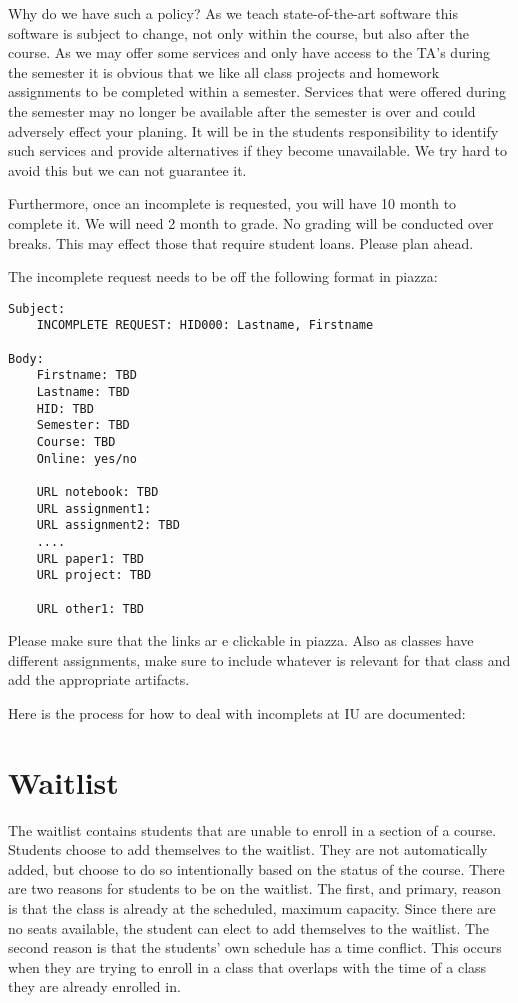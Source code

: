 Why do we have such a policy? As we teach state-of-the-art software this
software is subject to change, not only within the course, but also
after the course. As we may offer some services and only have access to
the TA's during the semester it is obvious that we like all class
projects and homework assignments to be completed within a semester.
Services that were offered during the semester may no longer be
available after the semester is over and could adversely effect your
planing. It will be in the students responsibility to identify such
services and provide alternatives if they become unavailable. We try
hard to avoid this but we can not guarantee it.

Furthermore, once an incomplete is requested, you will have 10 month to
complete it. We will need 2 month to grade. No grading will be conducted
over breaks. This may effect those that require student loans. Please
plan ahead.

The incomplete request needs to be off the following format in piazza:

\begin{verbatim}
Subject: 
    INCOMPLETE REQUEST: HID000: Lastname, Firstname

Body:
    Firstname: TBD
    Lastname: TBD
    HID: TBD
    Semester: TBD
    Course: TBD
    Online: yes/no

    URL notebook: TBD    
    URL assignment1:
    URL assignment2: TBD
    ....
    URL paper1: TBD
    URL project: TBD

    URL other1: TBD
\end{verbatim}

Please make sure that the links ar e clickable in piazza. Also as
classes have different assignments, make sure to include whatever is
relevant for that class and add the appropriate artifacts.

\begin{IU}
Here is the process for how to deal with incomplets at IU are documented:

\end{IU}


\section{Waitlist}\label{waitlist}

The waitlist contains students that are unable to enroll in a section of
a course. Students choose to add themselves to the waitlist. They are
not automatically added, but choose to do so intentionally based on the
status of the course. There are two reasons for students to be on the
waitlist. The first, and primary, reason is that the class is already at
the scheduled, maximum capacity. Since there are no seats available, the
student can elect to add themselves to the waitlist. The second reason
is that the students' own schedule has a time conflict. This occurs when
they are trying to enroll in a class that overlaps with the time of a
class they are already enrolled in.

